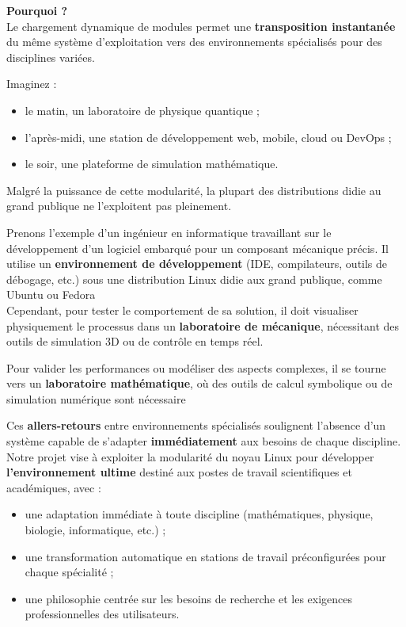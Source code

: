 \textbf{Pourquoi ? \\}  
Le chargement dynamique de modules permet une \textbf{transposition instantanée} du même système d’exploitation vers des environnements spécialisés pour des disciplines variées.  

\medskip
Imaginez :  
\begin{itemize}  
  \item le matin, un laboratoire de physique quantique ;  
  \item l’après-midi, une station de développement web, mobile, cloud ou DevOps ;  
  \item le soir, une plateforme de simulation mathématique.\\  
\end{itemize}  
\clearpage
Malgré la puissance de cette modularité, la plupart des distributions didie au  grand publique ne l’exploitent pas pleinement.  

Prenons l’exemple d’un ingénieur en informatique travaillant sur le développement d’un logiciel embarqué pour un composant mécanique précis. Il utilise un \textbf{environnement de développement}  (IDE, compilateurs, outils de débogage, etc.) sous une distribution Linux didie aux grand publique, comme Ubuntu ou Fedora \\
Cependant, pour tester le comportement de sa solution, il doit visualiser physiquement le processus dans un 
 \textbf{laboratoire de mécanique}, nécessitant des outils de simulation 3D ou de contrôle en temps réel.
 
Pour valider les performances ou modéliser des aspects complexes, il se tourne vers un  \textbf{laboratoire mathématique}, où des outils de calcul symbolique ou de simulation numérique sont nécessaire

Ces \textbf{allers-retours} entre environnements spécialisés soulignent l’absence d’un système capable de s’adapter \textbf{immédiatement} aux besoins de chaque discipline.\\
\bigbreak
Notre projet vise à exploiter la modularité du noyau Linux pour développer \textbf{l’environnement ultime} destiné aux postes de travail scientifiques et académiques, avec :  
\begin{itemize}  
  \item une adaptation immédiate à toute discipline (mathématiques, physique, biologie, informatique, etc.) ;  
  \item une transformation automatique en stations de travail préconfigurées pour chaque spécialité ;  
  \item une philosophie centrée sur les besoins de recherche et les exigences professionnelles des utilisateurs.  
\end{itemize}







